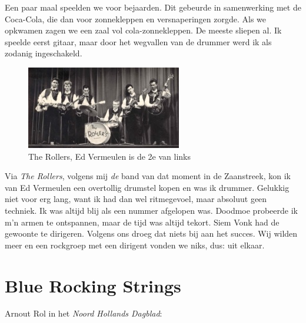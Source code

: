 \documentclass[12pt,twoside, openright]{memoir}
\begin{document}
Een paar maal speelden we voor bejaarden. Dit gebeurde in samenwerking met de Coca-Cola, die dan voor zonnekleppen en versnaperingen zorgde. Als we opkwamen zagen we een zaal vol cola-zonnekleppen. De meeste sliepen al. Ik speelde eerst gitaar, maar door het wegvallen van de drummer werd ik als zodanig ingeschakeld. 

\begin{figure}
\includegraphics[width=\textwidth]{img/ch24/rollers}
\caption*{\footnotesize The Rollers, Ed Vermeulen is de 2e van links}
\end{figure}

Via \emph{The Rollers}, volgens mij \emph{de} band van dat moment in de Zaanstreek, kon ik van Ed Vermeulen een overtollig drumstel kopen en was ik drummer. Gelukkig niet voor erg lang, want ik had dan wel ritmegevoel, maar absoluut geen techniek. Ik was altijd blij als een nummer afgelopen was. Doodmoe probeerde ik m'n armen te ontspannen, maar de tijd was altijd tekort. Siem Vonk had de gewoonte te dirigeren. Volgens ons droeg dat niets bij aan het succes. Wij wilden meer en een rockgroep met een dirigent vonden we niks, dus: uit elkaar. 

\chapter{Blue Rocking Strings} %
\label{cha:bluerocking}

Arnout Rol in het \emph{Noord Hollands Dagblad}: 
\end{document}
